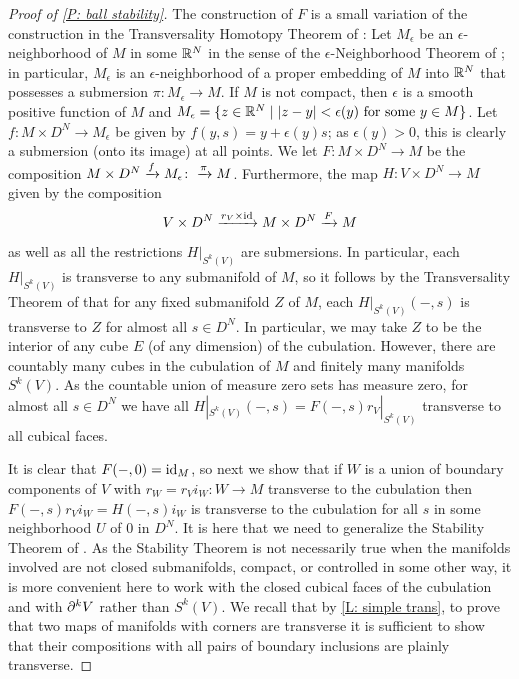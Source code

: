 \begin{proof}[Proof of \cref{P: ball stability}]
The construction of $F$ is a small variation of the construction in the Transversality Homotopy Theorem of \cite[Section 2.3]{GuPo74}:
Let $M_\epsilon$ be an $\epsilon$-neighborhood of $M$ in some $\mathbb{R}^N$ in the sense of the $\epsilon$-Neighborhood Theorem of \cite[Section 2.3]{GuPo74}; in particular,
$M_\epsilon$ is an $\epsilon$-neighborhood of a proper embedding of $M$ into $\mathbb{R}^N$ that possesses a submersion $\pi: M_\epsilon \to M$. If $M$ is not compact, then $\epsilon$ is a smooth positive function of $M$ and $M_\epsilon = \{z \in \mathbb{R}^N \mid |z-y|<\epsilon(y) \text{ for some }y \in M\}$. Let $f: M \times D^N \to M_\epsilon$ be given by $f(y, s) = y + \epsilon(y) s$; as $\epsilon(y)>0$, this is clearly a submersion (onto its image) at all points.
We let $F \colon M \times D^N \to M$ be the composition $M \times D^N \xrightarrow{f}M_\epsilon\colon\xrightarrow{\pi}M$.
Furthermore, the map $H \colon V \times D^N \to M$ given by the composition $$V \times D^N \xrightarrow{r_V \times \mathrm{id}} M \times D^N \xrightarrow{F} M$$ as well as all the restrictions $H|_{S^k(V)}$
are submersions.
In particular, each $H|_{S^k(V)}$ is transverse to any submanifold of $M$, so it follows by the Transversality Theorem of \cite[Section 2.3]{GuPo74} that for any fixed submanifold $Z$ of $M$, each $H|_{S^k(V)}(-,s)$ is transverse to $Z$ for almost all $s \in D^N$. In particular, we may take $Z$ to be the interior of any cube $E$ (of any dimension) of the cubulation. However, there are countably many cubes in the cubulation of $M$ and finitely many manifolds $S^k(V)$. As the countable union of measure zero sets has measure zero, for almost all $s \in D^N$ we have all $H|_{S^k(V)}(-,s) = F(-,s)r_V|_{S^k(V)}$ transverse to all cubical faces.

It is clear that $F(-,0) = \mathrm{id}_M$, so next we show that if $W$ is a union of boundary components of $V$ with $r_W = r_Vi_W \colon W \to M$ transverse to the cubulation then $F(-,s)r_Vi_W = H(-,s)i_W$ is transverse to the cubulation for all $s$ in some neighborhood $U$ of $0$ in $D^N$. It is here that we need to generalize the Stability Theorem of \cite[Section 1.6]{GuPo74}. As the Stability Theorem is not necessarily true when the manifolds involved are not closed submanifolds, compact, or controlled in some other way, it is more convenient here to work with the closed cubical faces of the cubulation and with $\partial^kV$ rather than $S^k(V)$. We recall that by \cref{L: simple trans}, to prove that two maps of manifolds with corners are transverse it is sufficient to show that their compositions with all pairs of boundary inclusions are plainly transverse.


\end{proof}
